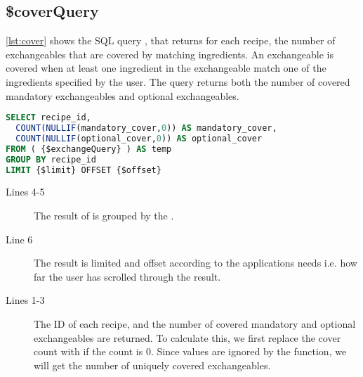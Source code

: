 \subsection*{\$coverQuery}
\autoref{lst:cover} shows the SQL query , that returns for each recipe, the number of exchangeables that are covered by matching ingredients. An exchangeable is covered when at least one ingredient in the exchangeable match one of the ingredients specified by the user. The query returns both the number of covered mandatory exchangeables and optional exchangeables.
\begin{lstlisting}[language=SQL, morekeywords={NULLIF,OFFSET}, float=h, label={lst:cover}, caption={\$coverQuery, returns the exchangeable cover counts.}]
SELECT recipe_id,
  COUNT(NULLIF(mandatory_cover,0)) AS mandatory_cover,
  COUNT(NULLIF(optional_cover,0)) AS optional_cover
FROM ( {$exchangeQuery} ) AS temp
GROUP BY recipe_id
LIMIT {$limit} OFFSET {$offset}
\end{lstlisting}
\begin{description}
\item[Lines 4-5] The result of  is grouped by the .
\item[Line 6] The result is limited and offset according to the applications needs i.e. how far the user has scrolled through the result.
\item[Lines 1-3] The ID of each recipe, and the number of covered mandatory and optional exchangeables are returned. To calculate this, we first replace the cover count with  if the count is 0. Since  values are ignored by the  function, we will get the number of uniquely covered exchangeables.
\end{description}



